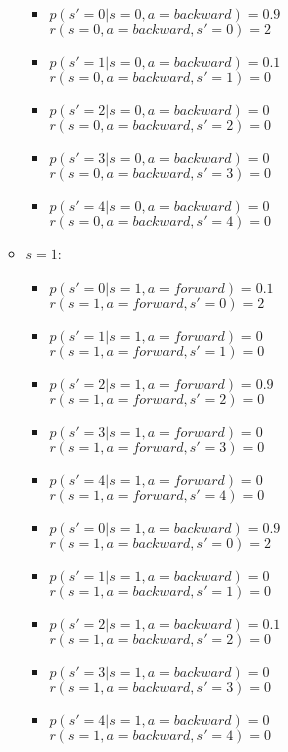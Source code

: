 \documentclass[english]{article}
\begin{document}
\begin{enumerate}
\begin{itemize}
\begin{itemize}
\item $p(s' = 0 | s = 0, a = backward) = 0.9$ \\ 
$r(s = 0, a = backward, s' = 0) = 2$ 
\item $p(s' = 1 | s = 0, a = backward) = 0.1$ \\
$r(s = 0, a = backward, s' = 1) = 0$ 
\item $p(s' = 2 | s = 0, a = backward) = 0$ \\
$r(s = 0, a = backward, s' = 2) = 0$ 
\item $p(s' = 3 | s = 0, a = backward) = 0$ \\
$r(s = 0, a = backward, s' = 3) = 0$ 
\item $p(s' = 4 | s = 0, a = backward) = 0$ \\
$r(s = 0, a = backward, s' = 4) = 0$ 
\end{itemize}

\item $s = 1$: 
\begin{itemize}
\item $p(s' = 0 | s = 1, a = forward) = 0.1$   \\ 
$r(s = 1, a = forward, s' = 0) = 2$  
\item $p(s' = 1 | s = 1, a = forward) = 0$ \\ 
$r(s = 1, a = forward, s' = 1) = 0$
\item $p(s' = 2 | s = 1, a = forward) = 0.9$ \\ 
$r(s = 1, a = forward, s' = 2) = 0$
\item $p(s' = 3 | s = 1, a = forward) = 0$ \\ 
$r(s = 1, a = forward, s' = 3) = 0$
\item $p(s' = 4 | s = 1, a = forward) = 0$ \\
$r(s = 1, a = forward, s' = 4) = 0$

\item $p(s' = 0 | s = 1, a = backward) = 0.9$ \\ 
$r(s = 1, a = backward, s' = 0) = 2$ 
\item $p(s' = 1 | s = 1, a = backward) = 0$ \\
$r(s = 1, a = backward, s' = 1) = 0$ 
\item $p(s' = 2 | s = 1, a = backward) = 0.1$ \\
$r(s = 1, a = backward, s' = 2) = 0$ 
\item $p(s' = 3 | s = 1, a = backward) = 0$ \\
$r(s = 1, a = backward, s' = 3) = 0$ 
\item $p(s' = 4 | s = 1, a = backward) = 0$ \\
$r(s = 1, a = backward, s' = 4) = 0$ 
\end{itemize}


\end{itemize}
\end{enumerate}
\end{document}
